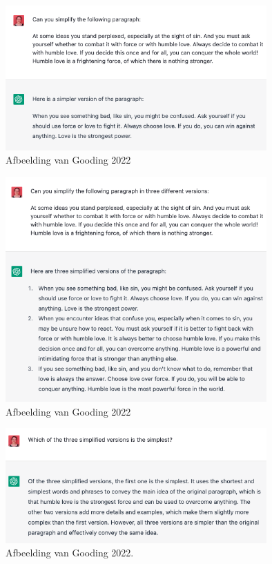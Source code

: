 \begin{figure}[H]
	\includegraphics[width=10cm]{img/chatgpt-example-simplification-gooding.png}
	\caption{Afbeelding van Gooding 2022}
	\label{img:simplification-gooding}
\end{figure}

\begin{figure}[H]
	\includegraphics[width=10cm]{img/chatgpt-example-different-versions-gooding.png}
	\caption{Afbeelding van Gooding 2022}
	\label{img:different-versions-gooding}
\end{figure}

\begin{figure}[H]
	\includegraphics[width=10cm]{img/chatgpt-example-evaluation-gooding.png}
	\caption{Afbeelding van Gooding 2022.}
	\label{img:evaluation-gooding}
\end{figure}

